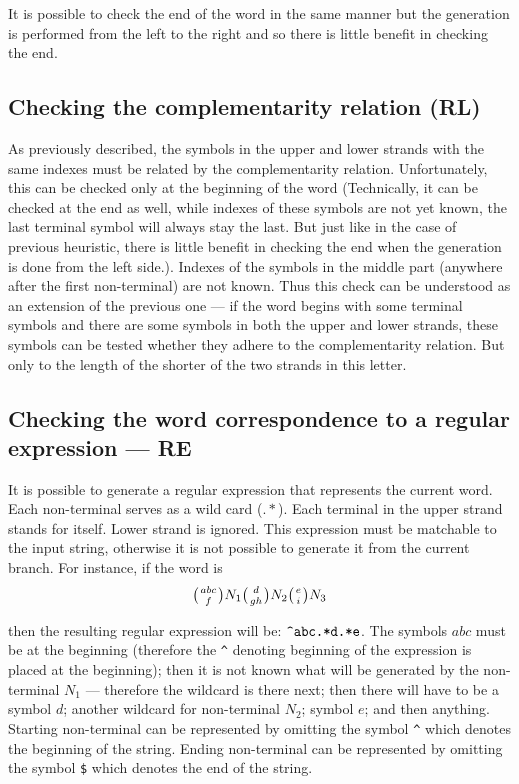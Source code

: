 It is possible to check the end of the word in the same manner but the generation is performed from the left to the right and so there is little benefit in checking the end.

\subsection{Checking the complementarity relation (RL)}
As previously described, the symbols in the upper and lower strands with the same indexes must be related by the complementarity relation. Unfortunately, this can be checked only at the beginning of the word (Technically, it can be checked at the end as well, while indexes of these symbols are not yet known, the last terminal symbol will always stay the last. But just like in the case of previous heuristic, there is little benefit in checking the end when the generation is done from the left side.). Indexes of the symbols in the middle part (anywhere after the first non-terminal) are not known. Thus this check can be understood as an extension of the previous one --- if the word begins with some terminal symbols and there are some symbols in both the upper and lower strands, these symbols can be tested whether they adhere to the complementarity relation. But only to the length of the shorter of the two strands in this letter.

\subsection{Checking the word correspondence to a regular expression --- RE}
It is possible to generate a regular expression that represents the current word. Each non-terminal serves as a wild card ($.*$). Each terminal in the upper strand stands for itself. Lower strand is ignored. This expression must be matchable to the input string, otherwise it is not possible to generate it from the current branch. For instance, if the word is
$$\wkpair{abc}{f}N_1\wkpair{d}{gh}N_2\wkpair{e}{i}N_3$$

then the resulting regular expression will be: $\verb/^abc.*d.*e/$. The symbols $abc$ must be at the beginning (therefore the \verb/^/ denoting beginning of the expression is placed at the beginning); then it is not known what will be generated by the non-terminal $N_1$ --- therefore the wildcard is there next; then there will have to be a symbol $d$; another wildcard for non-terminal $N_2$; symbol $e$; and then anything. Starting non-terminal can be represented by omitting the symbol \verb/^/ which denotes the beginning of the string. Ending non-terminal can be represented by omitting the symbol \verb/$/ which denotes the end of the string.

